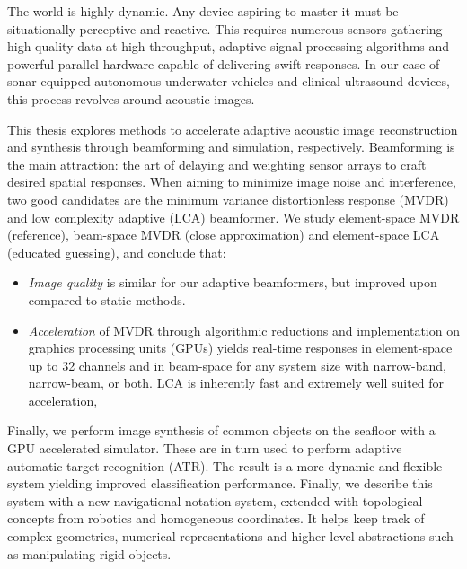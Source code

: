 
The world is highly dynamic. Any device aspiring to master it must be situationally perceptive and reactive. This requires numerous sensors gathering high quality data at high throughput, adaptive signal processing algorithms and powerful parallel hardware capable of delivering swift responses. In our case of sonar-equipped autonomous underwater vehicles and clinical ultrasound devices, this process revolves around acoustic images.

This thesis explores methods to accelerate adaptive acoustic image reconstruction and synthesis through beamforming and simulation, respectively. Beamforming is the main attraction: the art of delaying and weighting sensor arrays to craft desired spatial responses. When aiming to minimize image noise and interference, two good candidates are the minimum variance distortionless response (MVDR) and low complexity adaptive (LCA) beamformer. We study element-space MVDR (reference), beam-space MVDR (close approximation) and element-space LCA (educated guessing), and conclude that:
%
\begin{itemize}
\item \emph{Image quality} is similar for our adaptive beamformers, but improved upon compared to static methods.
%
%
\item \emph{Acceleration} of MVDR through algorithmic reductions and implementation on graphics processing units (GPUs) yields real-time responses in element-space up to 32 channels and in beam-space for any system size with narrow-band, narrow-beam, or both. LCA is inherently fast and extremely well suited for acceleration, 
\end{itemize}
%
Finally, we perform image synthesis of common objects on the seafloor with a GPU accelerated simulator. These are in turn used to perform adaptive automatic target recognition (ATR). The result is a more dynamic and flexible system yielding improved classification performance. Finally, we describe this system with a new navigational notation system, extended with topological concepts from robotics and homogeneous coordinates. It helps keep track of complex geometries, numerical representations and higher level abstractions such as manipulating rigid objects.



